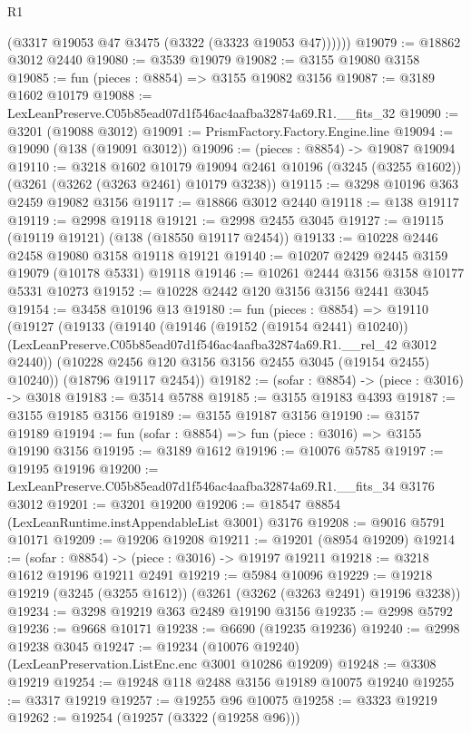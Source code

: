 \begin{lexlean}{R1}
\begin{coremodule}
          (@3317 @19053 @47 @3475 (@3322 (@3323 @19053 @47))))))
@19079 := @18862 @3012 @2440
@19080 := @3539 @19079
@19082 := @3155 @19080 @3158
@19085 := fun (pieces : @8854) => @3155 @19082 @3156
@19087 := @3189 @1602 @10179
@19088 := LexLeanPreserve.C05b85ead07d1f546ac4aafba32874a69.R1.__fits_32
@19090 := @3201 (@19088 @3012)
@19091 := PrismFactory.Factory.Engine.line
@19094 := @19090 (@138 (@19091 @3012))
@19096 := (pieces : @8854) -> @19087 @19094
@19110 := @3218
    @1602
    @10179
    @19094
    @2461
    @10196
    (@3245 (@3255 @1602))
    (@3261 (@3262 (@3263 @2461) @10179 @3238))
@19115 := @3298 @10196 @363 @2459 @19082 @3156
@19117 := @18866 @3012 @2440
@19118 := @138 @19117
@19119 := @2998 @19118
@19121 := @2998 @2455 @3045
@19127 := @19115 (@19119 @19121) (@138 (@18550 @19117 @2454))
@19133 := @10228 @2446 @2458 @19080 @3158 @19118 @19121
@19140 := @10207 @2429 @2445 @3159 @19079 (@10178 @5331) @19118
@19146 := @10261 @2444 @3156 @3158 @10177 @5331 @10273
@19152 := @10228 @2442 @120 @3156 @3156 @2441 @3045
@19154 := @3458 @10196 @13
@19180 := fun (pieces : @8854) =>
  @19110
    (@19127
      (@19133
        (@19140
          (@19146 (@19152 (@19154 @2441) @10240))
          (LexLeanPreserve.C05b85ead07d1f546ac4aafba32874a69.R1.__rel_42 @3012 @2440))
        (@10228 @2456 @120 @3156 @3156 @2455 @3045 (@19154 @2455) @10240))
      (@18796 @19117 @2454))
@19182 := (sofar : @8854) -> (piece : @3016) -> @3018
@19183 := @3514 @5788
@19185 := @3155 @19183 @4393
@19187 := @3155 @19185 @3156
@19189 := @3155 @19187 @3156
@19190 := @3157 @19189
@19194 := fun (sofar : @8854) => fun (piece : @3016) => @3155 @19190 @3156
@19195 := @3189 @1612
@19196 := @10076 @5785
@19197 := @19195 @19196
@19200 := LexLeanPreserve.C05b85ead07d1f546ac4aafba32874a69.R1.__fits_34 @3176 @3012
@19201 := @3201 @19200
@19206 := @18547 @8854 (LexLeanRuntime.instAppendableList @3001) @3176
@19208 := @9016 @5791 @10171
@19209 := @19206 @19208
@19211 := @19201 (@8954 @19209)
@19214 := (sofar : @8854) -> (piece : @3016) -> @19197 @19211
@19218 := @3218 @1612 @19196 @19211 @2491
@19219 := @5984 @10096
@19229 := @19218 @19219 (@3245 (@3255 @1612)) (@3261 (@3262 (@3263 @2491) @19196 @3238))
@19234 := @3298 @19219 @363 @2489 @19190 @3156
@19235 := @2998 @5792
@19236 := @9668 @10171
@19238 := @6690 (@19235 @19236)
@19240 := @2998 @19238 @3045
@19247 := @19234 (@10076 @19240) (LexLeanPreservation.ListEnc.enc @3001 @10286 @19209)
@19248 := @3308 @19219
@19254 := @19248 @118 @2488 @3156 @19189 @10075 @19240
@19255 := @3317 @19219
@19257 := @19255 @96 @10075
@19258 := @3323 @19219
@19262 := @19254 (@19257 (@3322 (@19258 @96)))

\end{coremodule}
\end{lexlean}
